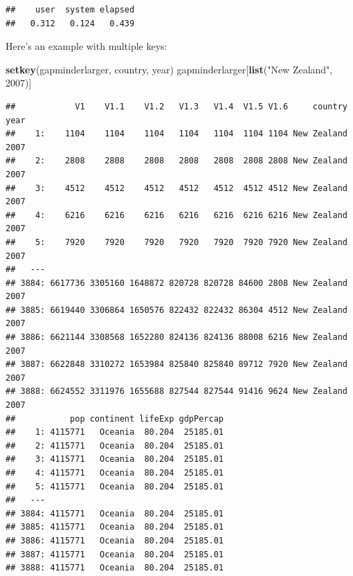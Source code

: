 \documentclass[]{article}
\newenvironment{Shaded}{\begin{snugshade}}{\end{snugshade}}
\newcommand{\KeywordTok}[1]{\textcolor[rgb]{0.13,0.29,0.53}{\textbf{{#1}}}}
\newcommand{\DecValTok}[1]{\textcolor[rgb]{0.00,0.00,0.81}{{#1}}}
\newcommand{\StringTok}[1]{\textcolor[rgb]{0.31,0.60,0.02}{{#1}}}
\newcommand{\NormalTok}[1]{{#1}}
\begin{document}
\begin{Shaded}
\end{Shaded}

\begin{verbatim}
##    user  system elapsed 
##   0.312   0.124   0.439
\end{verbatim}

Here's an example with multiple keys:

\begin{Shaded}
\begin{Highlighting}[]
\KeywordTok{setkey}\NormalTok{(gapminderlarger, country, year)}
\NormalTok{gapminderlarger[}\KeywordTok{list}\NormalTok{(}\StringTok{"New Zealand"}\NormalTok{, }\DecValTok{2007}\NormalTok{)]}
\end{Highlighting}
\end{Shaded}

\begin{verbatim}
##            V1    V1.1    V1.2   V1.3   V1.4  V1.5 V1.6     country year
##    1:    1104    1104    1104   1104   1104  1104 1104 New Zealand 2007
##    2:    2808    2808    2808   2808   2808  2808 2808 New Zealand 2007
##    3:    4512    4512    4512   4512   4512  4512 4512 New Zealand 2007
##    4:    6216    6216    6216   6216   6216  6216 6216 New Zealand 2007
##    5:    7920    7920    7920   7920   7920  7920 7920 New Zealand 2007
##   ---                                                                  
## 3884: 6617736 3305160 1648872 820728 820728 84600 2808 New Zealand 2007
## 3885: 6619440 3306864 1650576 822432 822432 86304 4512 New Zealand 2007
## 3886: 6621144 3308568 1652280 824136 824136 88008 6216 New Zealand 2007
## 3887: 6622848 3310272 1653984 825840 825840 89712 7920 New Zealand 2007
## 3888: 6624552 3311976 1655688 827544 827544 91416 9624 New Zealand 2007
##           pop continent lifeExp gdpPercap
##    1: 4115771   Oceania  80.204  25185.01
##    2: 4115771   Oceania  80.204  25185.01
##    3: 4115771   Oceania  80.204  25185.01
##    4: 4115771   Oceania  80.204  25185.01
##    5: 4115771   Oceania  80.204  25185.01
##   ---                                    
## 3884: 4115771   Oceania  80.204  25185.01
## 3885: 4115771   Oceania  80.204  25185.01
## 3886: 4115771   Oceania  80.204  25185.01
## 3887: 4115771   Oceania  80.204  25185.01
## 3888: 4115771   Oceania  80.204  25185.01
\end{verbatim}
\end{document}
